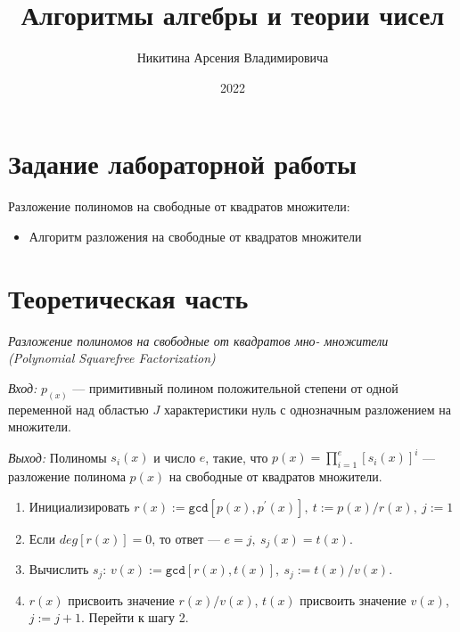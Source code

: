 \documentclass[bachelor, och, labwork]{shiza}
\begin{document}
\title{Алгоритмы алгебры и теории чисел}





\author{Никитина Арсения Владимировича}




\date{2022}

\maketitle



\tableofcontents

\section{Задание лабораторной работы}

Разложение полиномов на свободные от квадратов множители:

\begin{itemize}
    \item Алгоритм разложения на свободные от квадратов множители
\end{itemize}

\section{Теоретическая часть}

\begin{center}
    \textit{Разложение полиномов на свободные от квадратов мно-
множители (Polynomial Squarefree Factorization)}
\end{center}

\textit{Вход:} $p_(x)$ --- примитивный полином положительной степени
от одной переменной над областью $J$ характеристики нуль с
однозначным разложением на множители.

\textit{Выход:} Полиномы $s_i(x)$ и число $e$, такие, что $p(x) = \prod_{i=1}^{e} [s_i(x)]^i$ ---
разложение полинома $p(x)$ на свободные от квадратов множители.

\begin{enumerate}
   \item Инициализировать $r(x) := \mathtt{gcd}[p(x), p^{'}(x)], ~ t:= p(x)/r(x), ~j:=1$
   \item Если $deg[r(x)] = 0$, то ответ --- $e = j, ~s_j(x)=t(x)$.
   \item Вычислить $s_j$: $v(x) := \mathtt{gcd}[r(x), t(x)], ~ s_j := t(x)/v(x)$.
   \item $r(x)$ присвоить значение $r(x)/v(x)$, $t(x)$ присвоить значение $v(x)$,
   $j:= j + 1$. Перейти к шагу 2. 
\end{enumerate}
\end{document}
